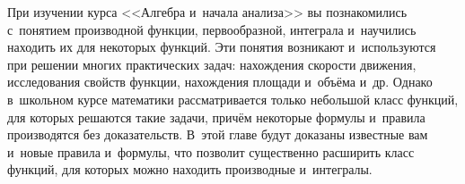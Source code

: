 
При изучении курса <<Алгебра и~начала анализа>> вы познакомились с~понятием производной функции,
первообразной, интеграла и~научились находить их для некоторых функций.
Эти понятия возникают и~используются при решении многих практических задач:
нахождения скорости движения, исследования свойств функции, нахождения площади и~объёма
и~др. Однако в~школьном курсе математики рассматривается только небольшой класс
функций, для которых решаются такие задачи, причём некоторые формулы и~правила
производятся без доказательств.
В~этой главе будут доказаны известные вам и~новые правила и~формулы,
что позволит существенно расширить класс функций, для которых можно находить
производные и~интегралы.
